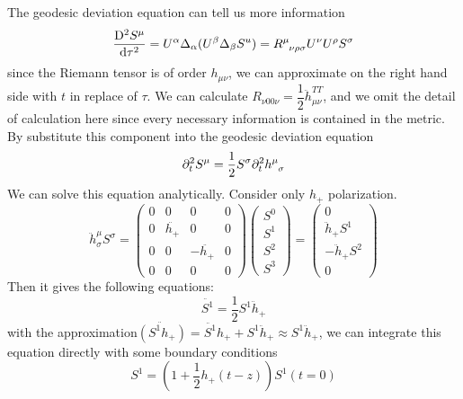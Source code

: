\documentclass[10pt]{article}
\begin{document}
The geodesic deviation equation can tell us more information
\begin{equation}\label{eq: geodesic_deviation_eqn}
\dfrac{\mathrm{D}^2 S^\mu}{\mathrm{d}\tau^2}
=U^\alpha \Delta_\alpha (U^\beta \Delta_\beta S^u)= R^{\mu}_{\hphantom{\mu}\nu\rho\sigma} U^\nu U^\rho S^\sigma
\end{equation}
since the Riemann tensor is of order $ h_{\mu\nu} $, we can approximate on the right hand side with $ t $ in replace of $ \tau $. We can calculate $ R_{\nu 0 0 \nu}=\dfrac{1}{2} \ddot{h}^{TT}_{\mu\nu} $, and we omit the detail of calculation here since every necessary information is contained in the metric. By substitute this component into the geodesic deviation equation
\begin{equation}\label{eq: compenent_geodesic_deviation}
\partial^2_t S^\mu= \dfrac{1}{2} S^\sigma \partial^2_t h^\mu_{\hphantom{\mu}\sigma}
\end{equation}
We can solve this equation analytically. Consider only $ h_+ $ polarization.
\begin{equation}\label{key}
\ddot{h}^\mu_\sigma S^\sigma
=
\begin{pmatrix}
0 & 0 & 0 & 0 \\ 
0 & \ddot{h_+} & 0 & 0 \\ 
0 & 0 & -\ddot{h_+} & 0 \\ 
0 & 0 & 0 & 0
\end{pmatrix}
\begin{pmatrix}
S^0 \\ 
S^1 \\ 
S^2\\ 
S^3
\end{pmatrix}
=
\begin{pmatrix}
0 \\ 
 \ddot{h}_+S^1 \\ 
- \ddot{h}_+S^2\\ 
0
\end{pmatrix}
\end{equation}
Then it gives the following equations:
\begin{equation}\label{eq: geo_deiviation_component}
\ddot{S^1}=\dfrac{1}{2} S^1 \ddot{h}_+
\end{equation}
with the approximation$ \ddot{(S^1 h_+)}=\ddot{S^1} h_+ +S^1 \ddot{h}_+ \approx S^1 \ddot{h}_+ $, we can integrate this equation directly with some boundary conditions
\begin{equation}\label{eq: sln to S1}
S^1=(1+\dfrac{1}{2} h_+(t-z)) S^1(t=0)
\end{equation}
\end{document}
